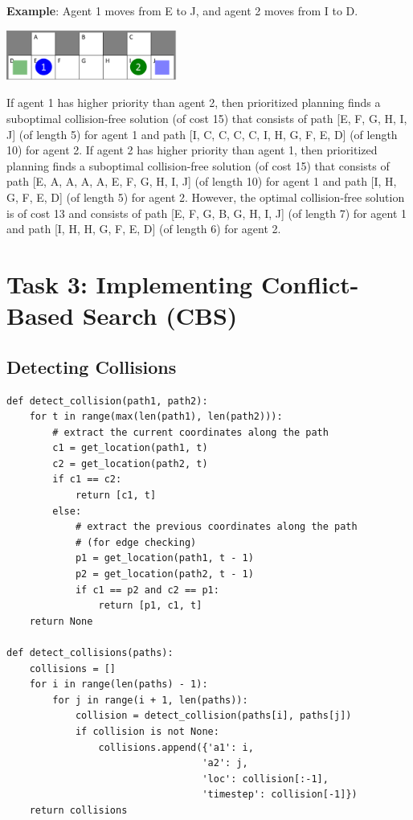 \documentclass[11pt]{article}
\begin{document}
\begin{itemize}
\textbf{Example}: Agent 1 moves from E to J, and agent 2 moves from I to D. 
\begin{center}
\includegraphics[width=0.42\textwidth]{images/sol5.png}
\end{center}

If agent 1 has higher priority than agent 2, then prioritized planning finds a suboptimal collision-free solution (of cost 15) that consists of path [E, F, G, H, I, J] (of length 5) for agent 1 and path [I, C, C, C, C, I, H, G, F, E, D] (of length 10) for agent 2. If agent 2 has higher priority than agent 1, then prioritized planning finds a suboptimal collision-free solution (of cost 15) that consists of path [E, A, A, A, A, E, F, G, H, I, J] (of length 10) for agent 1 and path [I, H, G, F, E, D] (of length 5) for agent 2. However, the optimal collision-free solution is of cost 13 and consists of path [E, F, G, B, G, H, I, J] (of length 7) for agent 1 and path [I, H, H, G, F, E, D] (of length 6) for agent 2. 

\end{itemize}

\section{Task 3: Implementing Conflict-Based Search (CBS)}

\subsection{Detecting Collisions}

\begin{verbatim}
def detect_collision(path1, path2):
    for t in range(max(len(path1), len(path2))):
        # extract the current coordinates along the path
        c1 = get_location(path1, t)
        c2 = get_location(path2, t)
        if c1 == c2:
            return [c1, t]
        else:
            # extract the previous coordinates along the path
            # (for edge checking)
            p1 = get_location(path1, t - 1)
            p2 = get_location(path2, t - 1)
            if c1 == p2 and c2 == p1:
                return [p1, c1, t]
    return None
    
def detect_collisions(paths):
    collisions = []
    for i in range(len(paths) - 1):
        for j in range(i + 1, len(paths)):
            collision = detect_collision(paths[i], paths[j])
            if collision is not None:
                collisions.append({'a1': i,
                                  'a2': j,
                                  'loc': collision[:-1],
                                  'timestep': collision[-1]})
    return collisions
\end{verbatim}
\end{document}
